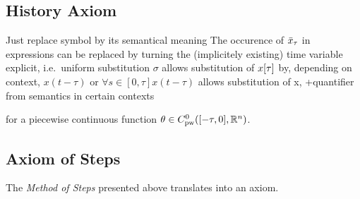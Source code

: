 \documentclass[10pt]{report}
\begin{document}


        \subsection{History Axiom}
            \label{history-axiom}
            Just replace symbol by its semantical meaning
            The occurence of $\bar{x}_{\tau}$ in expressions can be replaced by turning the (implicitely existing) time variable explicit, i.e.\
            uniform substitution $\sigma$
            allows substitution of $x[\tau]$ by, depending on context, $x(t-\tau)$ or $\forall{s\in[0,\tau]}{x(t-\tau)}$
            allows substitution of x, +quantifier from semantics in certain contexts
            \begin{calculus}
            \end{calculus}
            for a piecewise continuous function $\theta\in\statespace$.

        \subsection{Axiom of Steps}
            \label{sec:axiom-of-steps}
            The \emph{Method of Steps} presented above translates into an axiom.

            \begin{calculus}

            \end{calculus}
\end{document}
